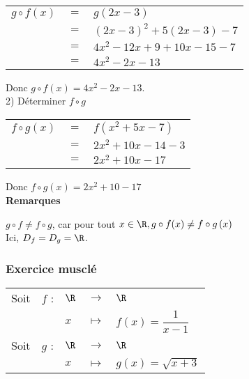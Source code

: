 \begin{tabular}{lll}
$g \circ f\left(x\right)$ & $=$ &$g\left(2x - 3\right)$ \\
& $=$ & $\left(2x - 3\right)^2 + 5\left(2x - 3\right) - 7$ \\
& $=$ & $4x^2 - 12x + 9 + 10x - 15 - 7$ \\
& $=$ & $4x^2 -2x -13 $ \\
\end{tabular}

\vspace*{.3cm}

Donc $g \circ f\left(x\right) = 4x^2 -2x -13$. \\

2) Déterminer $f \circ g$

\begin{tabular}{lll}
$f \circ g\left(x\right)$ & $=$ &$f\left(x^2 + 5x - 7\right)$ \\
& $=$ & $2x^2 + 10x - 14 - 3$ \\
& $=$ & $2x^2 + 10x - 17 $ \\
\end{tabular}

\vspace*{.3cm}

Donc $f \circ g\left(x\right) = 2x^2 + 10 - 17$ \\

\textbf{Remarques}

$g \circ f \neq f \circ g$, car pour tout $x \in \R, g \circ f(x) \neq f \circ g\left(x\right)$ \\

Ici, $D_f = D_g = \R$.

\newpage

\vspace*{-1cm}

\subsubsection{Exercice musclé}

\begin{tabular}{lllll}
Soit & $f$ : & $\R$ & $\longrightarrow$ & $\R$ \\
& & $x$ & $\longmapsto$ & $f\left(x\right) = \dfrac{1}{x-1}$\\
Soit & $g$ : & $\R$ & $\longrightarrow$ & $\R$ \\
& & $x$ & $\longmapsto$ & $g\left(x\right) = \sqrt{x+3}$ \\
\end{tabular}

